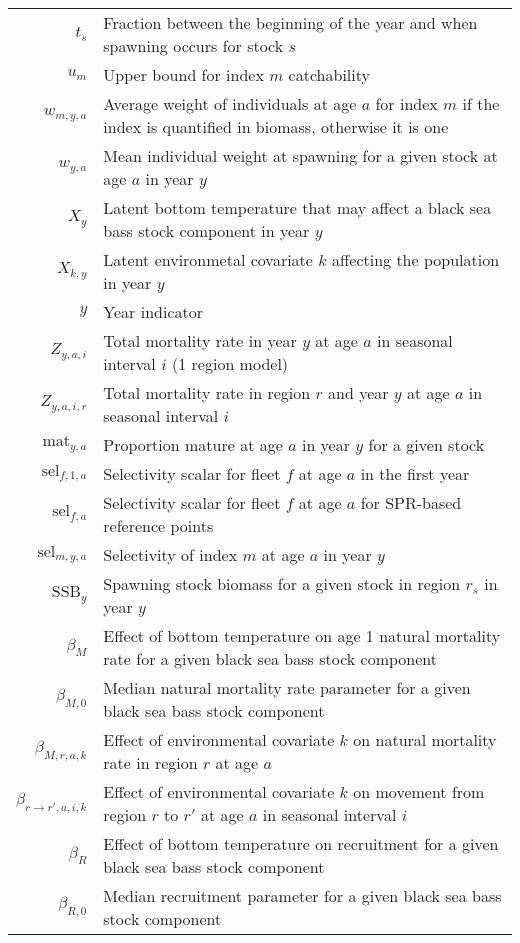 \begin{longtable}[c]{r p{}}
$t_s$ & Fraction between the beginning of the year and when spawning occurs for stock $s$\\
$u_{m}$ & Upper bound for index $m$ catchability\\
$w_{m,y,a}$ & Average weight of individuals at age $a$ for index $m$ if the index is quantified in biomass, otherwise it is one\\
$w_{y,a}$ & Mean individual weight at spawning for a given stock at age $a$ in year $y$\\
$X_{y}$ & Latent bottom temperature that may affect a black sea bass stock component in year $y$\\
$X_{k,y}$ & Latent environmetal covariate $k$ affecting the population in year $y$\\
$y$ & Year indicator\\
$Z_{y,a,i}$ & Total mortality rate in year $y$ at age $a$ in seasonal interval $i$ (1 region model)\\
$Z_{y,a,i,r}$ & Total mortality rate in region $r$ and year $y$ at age $a$ in seasonal interval $i$\\
$\text{mat}_{y,a}$ & Proportion mature at age $a$ in year $y$ for a given stock\\
$\text{sel}_{f,1,a}$ & Selectivity scalar for fleet $f$ at age $a$ in the first year\\
$\text{sel}_{f,a}$ & Selectivity scalar for fleet $f$ at age $a$ for SPR-based reference points\\
$\text{sel}_{m,y,a}$ &  Selectivity of index $m$ at age $a$ in year $y$ \\
$\text{SSB}_{y}$ & Spawning stock biomass for a given stock in region $r_s$ in year $y$\\
$\beta_M$ & Effect of bottom temperature on age 1 natural mortality rate for a given black sea bass stock component\\
$\beta_{M,0}$ & Median natural mortality rate parameter for a given black sea bass stock component\\
$\beta_{M,r,a,k}$ & Effect of environmental covariate $k$ on natural mortality rate in region $r$ at age $a$\\
$\beta_{r \rightarrow r',a,i,k}$ & Effect of environmental covariate $k$ on movement from region $r$ to $r'$ at age $a$ in seasonal interval $i$\\
$\beta_R$ & Effect of bottom temperature on recruitment for a given black sea bass stock component\\
$\beta_{R,0}$ & Median recruitment parameter for a given black sea bass stock component\\

\end{longtable}
